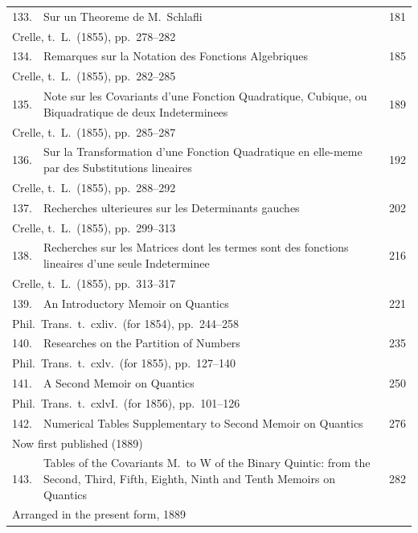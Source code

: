 \documentclass[11pt,a4paper]{book}
\begin{document}
\begin{longtable}{rp{8cm}l}
133. & Sur un Theoreme de M.\ Schlafli & 181\\
\multicolumn{3}{l}{\small Crelle, t.\ L.\ (1855), pp.\ 278--282}\\[0.5em]
134. & Remarques sur la Notation des Fonctions Algebriques & 185\\
\multicolumn{3}{l}{\small Crelle, t.\ L.\ (1855), pp.\ 282--285}\\[0.5em]
135. & Note sur les Covariants d'une Fonction Quadratique, Cubique, ou Biquadratique de deux Indeterminees & 189\\
\multicolumn{3}{l}{\small Crelle, t.\ L.\ (1855), pp.\ 285--287}\\[0.5em]
136. & Sur la Transformation d'une Fonction Quadratique en elle-meme par des Substitutions lineaires & 192\\
\multicolumn{3}{l}{\small Crelle, t.\ L.\ (1855), pp.\ 288--292}\\[0.5em]
137. & Recherches ulterieures sur les Determinants gauches & 202\\
\multicolumn{3}{l}{\small Crelle, t.\ L.\ (1855), pp.\ 299--313}\\[0.5em]
138. & Recherches sur les Matrices dont les termes sont des fonctions lineaires d'une seule Indeterminee & 216\\
\multicolumn{3}{l}{\small Crelle, t.\ L.\ (1855), pp.\ 313--317}\\[0.5em]
139. & An Introductory Memoir on Quantics & 221\\
\multicolumn{3}{l}{\small Phil.\ Trans.\ t.\ cxliv.\ (for 1854), pp.\ 244--258}\\[0.5em]
140. & Researches on the Partition of Numbers & 235\\
\multicolumn{3}{l}{\small Phil.\ Trans.\ t.\ cxlv.\ (for 1855), pp.\ 127--140}\\[0.5em]
141. & A Second Memoir on Quantics & 250\\
\multicolumn{3}{l}{\small Phil.\ Trans.\ t.\ cxlvI.\ (for 1856), pp.\ 101--126}\\[0.5em]
142. & Numerical Tables Supplementary to Second Memoir on Quantics & 276\\
\multicolumn{3}{l}{\small Now first published (1889)}\\[0.5em]
143. & Tables of the Covariants M.\ to W of the Binary Quintic: from the Second, Third, Fifth, Eighth, Ninth and Tenth Memoirs on Quantics & 282\\
\multicolumn{3}{l}{\small Arranged in the present form, 1889}\\[0.5em]

\end{longtable}
\end{document}
